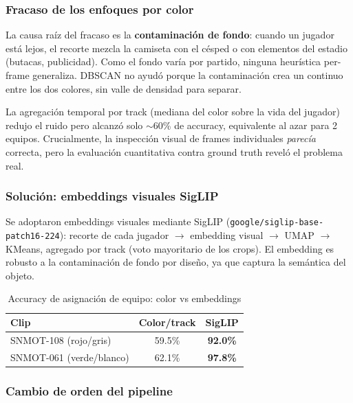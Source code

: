 \documentclass[conference]{IEEEtran}
\begin{document}
\subsubsection{Fracaso de los enfoques por color}

La causa raíz del fracaso es la \textbf{contaminación de fondo}: cuando un
jugador está lejos, el recorte mezcla la camiseta con el césped o con
elementos del estadio (butacas, publicidad). Como el fondo varía por
partido, ninguna heurística per-frame generaliza. DBSCAN no ayudó porque la
contaminación crea un continuo entre los dos colores, sin valle de densidad
para separar.

La agregación temporal por track (mediana del color sobre la vida del
jugador) redujo el ruido pero alcanzó solo $\sim$60\% de accuracy,
equivalente al azar para 2 equipos. Crucialmente, la inspección visual de
frames individuales \emph{parecía} correcta, pero la evaluación cuantitativa
contra ground truth reveló el problema real.

\subsubsection{Solución: embeddings visuales SigLIP}

Se adoptaron embeddings visuales mediante SigLIP
(\texttt{google/siglip-base-patch16-224}): recorte de cada jugador $\to$
embedding visual $\to$ UMAP $\to$ KMeans, agregado por track (voto
mayoritario de los crops). El embedding es robusto a la contaminación de
fondo por diseño, ya que captura la semántica del objeto.

\begin{table}[htbp]
\caption{Accuracy de asignación de equipo: color vs embeddings}
\begin{center}
\begin{tabular}{lcc}
\toprule
\textbf{Clip} & \textbf{Color/track} & \textbf{SigLIP} \\
\midrule
SNMOT-108 (rojo/gris) & 59.5\% & \textbf{92.0\%} \\
SNMOT-061 (verde/blanco) & 62.1\% & \textbf{97.8\%} \\
\bottomrule
\end{tabular}
\label{tab:embed_results}
\end{center}
\end{table}

\subsubsection{Cambio de orden del pipeline}
\end{document}

